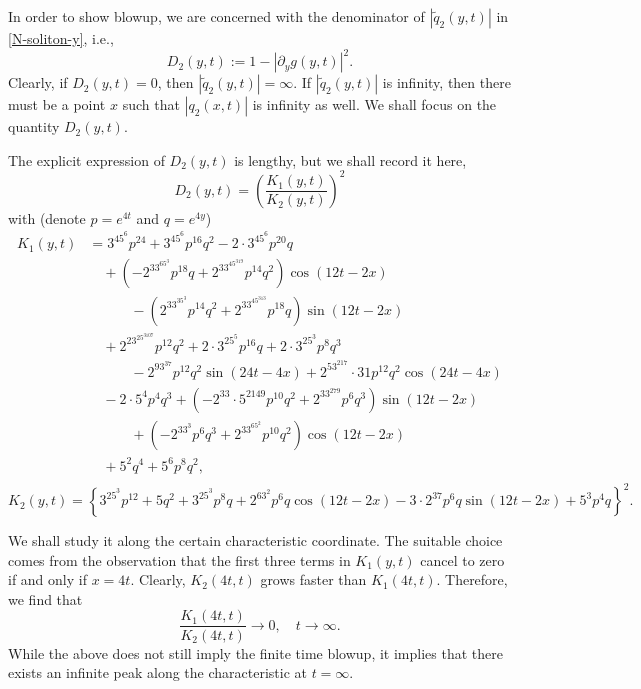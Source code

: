 \documentclass[11pt]{article}
\begin{document}

In order to show blowup, we are concerned with the denominator of $|\tilde{q}_2(y,t)|$ in \eqref{N-soliton-y}, i.e.,
$$D_2(y,t):=1-|\partial_yg(y,t)|^2.$$
Clearly, if $D_2(y,t)=0$, then $|\tilde{q}_2(y,t)|=\infty$. If $|\tilde{q}_2(y,t)|$ is infinity, then there must be a point $x$ such that $|q_2(x,t)|$ is infinity as well. We shall focus on the quantity $D_2(y,t)$.
  
The explicit expression of $D_2(y,t)$ is lengthy, but we shall record it here, 
$$D_2(y,t)=\left(\frac{K_1(y,t)}{K_2(y,t)}\right)^2$$
with 
(denote $p=e^{4t}$ and $q=e^{4y}$)
\begin{align*}
K_1(y,t)&=
3^45^6p^{24}+3^45^6p^{16}q^2-2\cdot3^45^6p^{20}q\\
&\quad  +(-2^33^65^3p^{18}q+2^33^45^319p^{14}q^2)\cos(12t-2x)\\
&\quad \quad \quad -(2^33^35^3p^{14}q^2+2^33^45^313p^{18}q)\sin(12t-2x)\\
&\quad +2^23^25^3107p^{12}q^2+2\cdot3^25^5p^{16}q+2\cdot3^25^3p^8q^3\\
&\quad\quad \quad-2^93^37p^{12}q^2\sin(24t-4x)+2^53^217\cdot31p^{12}q^2\cos(24t-4x)\\
&\quad-2\cdot5^4p^4q^3+(-2^33\cdot5^2149p^{10}q^2+2^33^279p^6q^3)\sin(12t-2x)\\ 
&\quad\quad \quad+(-2^33^3p^{6}q^{3}+2^33^65^2p^{10}q^2)\cos(12t-2x)\\
&\quad+5^2q^4+5^6p^8q^2,\\
\end{align*}
$$K_2(y,t)=\left\{3^25^3p^{12}+5q^2+3^25^3p^8q+2^63^2p^6q\cos(12t-2x)-3\cdot2^37p^6q\sin(12t-2x)+5^3p^4q\right\}^2.$$


We shall study it along the certain characteristic coordinate. The suitable choice comes from the observation that the first three terms in $K_1(y,t)$ cancel to zero if and only if $x=4t$. Clearly, $K_2(4t,t)$ grows faster than $K_1(4t,t)$. Therefore, we find that 
$$\frac{K_1(4t,t)}{K_2(4t,t)} \rightarrow 0, \quad t\rightarrow \infty.$$
While the above does not still imply the finite time blowup, it implies that there exists an infinite peak along the characteristic at $t=\infty$. 
\end{document}
